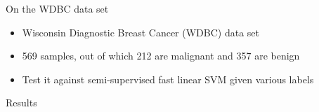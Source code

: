 \begin{frame}{On the WDBC data set}
\begin{itemize}
\item Wisconsin Diagnostic Breast Cancer (WDBC) data set
\item 569 samples, out of which 212 are malignant and 357 are benign
\item Test it against semi-supervised fast linear SVM given various labels
\end{itemize}
\end{frame}
\begin{frame}{Results}

\end{frame}
